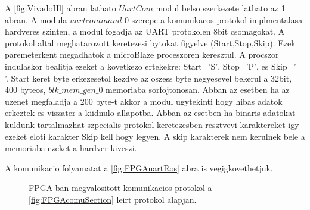 A \ref{fig:VivadoHl} abran lathato $UartCom$ modul belso szerkezete lathato az \ref{fig:UartComVivaldo} abran. A modula $uartcommand\_0$ szerepe a komunikacos protokol implmentalasa hardveres szinten, a modul fogadja az UART protokolen 8bit csomagokat. A protokol altal meghatarozott keretezesi bytokat figyelve (Start,Stop,Skip). Ezek paremeterkent megadhatok a microBlaze proceszoren keresztul. A procszor indulaskor bealitja ezeket a kovetkezo ertekekre: Start='S', Stop='P', es Skip='\\'. 
Start keret byte erkezesetol kezdve az oszess byte negyesevel bekerul a 32bit, 400 byteos, $blk\_mem\_gen\_0$ memoriaba sorfojtonosan. Abban az esetben ha az uzenet megfaladja a 200 byte-t akkor a modul ugytekinti hogy hibas adatok erkeztek es viszater a kiidnulo allapotba. Abban az esetben ha binaris adatokat kuldunk tartalmazhat szpecialis protokol keretezesben resztvevi karaktereket igy ezeket eloti karakter Skip kell hogy legyen. A skip karakterek nem kerulnek bele a memoriaba ezeket a hardver kiveszi.

A komunikacio folyamatat a \ref{fig:FPGAuartRos} abra is vegigkovethetjuk.

\begin{figure}[H]		
  \caption{FPGA ban megvalositott komunikacios protokol a 	     \ref{fig:FPGAcomuSection} leirt protokol alapjan.}
  \label{fig:UartComVivaldo}
\end{figure}



